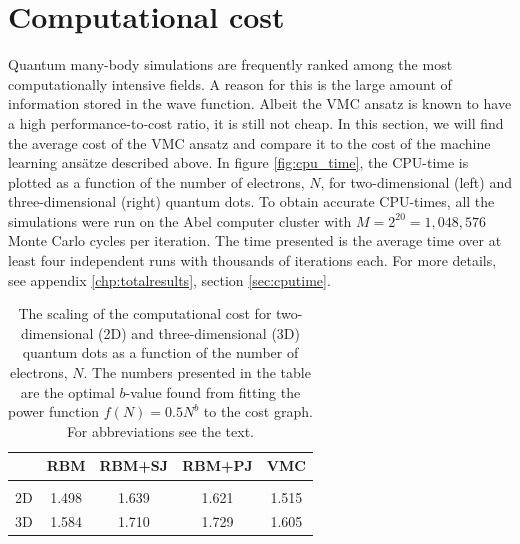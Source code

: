 \section{Computational cost}
Quantum many-body simulations are frequently ranked among the most computationally intensive fields. A reason for this is the large amount of information stored in the wave function. Albeit the VMC ansatz is known to have a high performance-to-cost ratio, it is still not cheap. In this section, we will find the average cost of the VMC ansatz and compare it to the cost of the machine learning ansätze described above. In figure \eqref{fig:cpu_time}, the CPU-time is plotted as a function of the number of electrons, $N$, for two-dimensional (left) and three-dimensional (right) quantum dots. To obtain accurate CPU-times, all the simulations were run on the Abel computer cluster with $M=2^{20}=1,048,576$ Monte Carlo cycles per iteration. The time presented is the average time over at least four independent runs with thousands of iterations each. For more details, see appendix \ref{chp:totalresults}, section \ref{sec:cputime}.

\begin{table}
	\caption{The scaling of the computational cost for two-dimensional (2D) and three-dimensional (3D) quantum dots as a function of the number of electrons, $N$. The numbers presented in the table are the optimal $b$-value found from fitting the power function $f(N)=0.5N^b$ to the cost graph. For abbreviations see the text.}
	\begin{tabularx}{\textwidth}{CCCCC} \hline\hline
		\label{tab:cputimefit}
		\makecell{\\ \phantom{=}} & RBM & RBM+SJ & RBM+PJ & VMC \\ \hline \\
		2D & 1.498 & 1.639 & 1.621 & 1.515 \\ 
		3D & 1.584 & 1.710 & 1.729 & 1.605 \\ \hline\hline
	\end{tabularx}
\end{table} 

